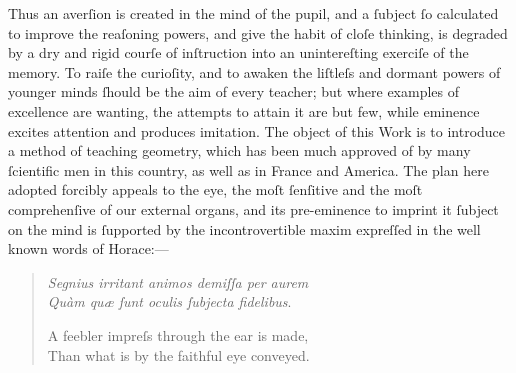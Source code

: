 Thus an averſion is created in the mind of the pupil, and a ſubject ſo calculated to improve the reaſoning powers, and give the habit of cloſe thinking, is degraded by a dry and rigid courſe of inſtruction into an unintereſting exerciſe of the memory. To raiſe the curioſity, and to awaken the liſtleſs and dormant powers of younger minds ſhould be the aim of every teacher; but where examples of excellence are wanting, the attempts to attain it are but few, while eminence excites attention and produces imitation. The object of this Work is to introduce a method of teaching geometry, which has been much approved of by many ſcientific men in this country, as well as in France and America. The plan here adopted forcibly appeals to the eye, the moſt ſenſitive and the moſt comprehenſive of our external organs, and its pre-eminence to imprint it ſubject on the mind is ſupported by the incontrovertible maxim expreſſed in the well known words of Horace:—
\begin{quotation}
    \noindent \small{\textit{Segnius irritant animos demiſſa per aurem\\
            Quàm quæ ſunt oculis ſubjecta fidelibus}}.

    \noindent \small{A feebler impreſs through the ear is made,\\
        Than what is by the faithful eye conveyed}.
\end{quotation}
\vspace{1ex}

